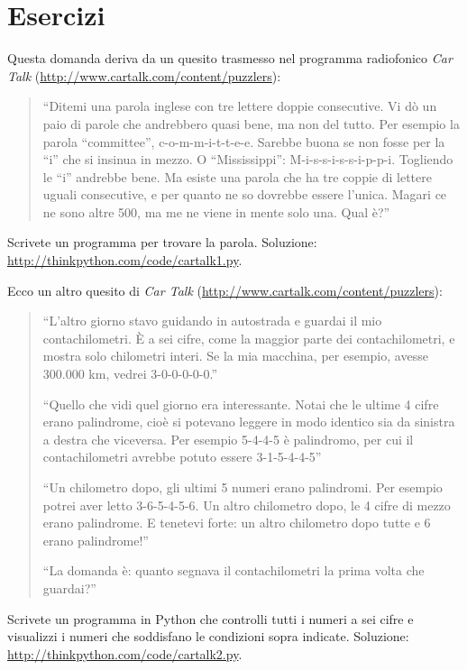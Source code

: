 \documentclass[10pt]{book}
\begin{document}
\section{Esercizi}

\begin{exercise}

Questa domanda deriva da un quesito trasmesso nel programma radiofonico {\em Car Talk} 
(\url{http://www.cartalk.com/content/puzzlers}):

\begin{quote}
``Ditemi una parola inglese con tre lettere doppie consecutive. Vi dò un paio di parole che andrebbero quasi bene, ma non del tutto. Per esempio la parola ``committee'', c-o-m-m-i-t-t-e-e. Sarebbe buona se non fosse per la ``i'' che si insinua in mezzo. O ``Mississippi'': M-i-s-s-i-s-s-i-p-p-i. Togliendo le ``i'' andrebbe bene. Ma esiste una parola che ha tre coppie di lettere uguali consecutive, e per quanto ne so dovrebbe essere l'unica. Magari ce ne sono altre 500, ma me ne viene in mente solo una. Qual è?''
\end{quote}

Scrivete un programma per trovare la parola.  Soluzione: \url{http://thinkpython.com/code/cartalk1.py}.

\end{exercise}

\vspace{0.2in}
\begin{exercise}
Ecco un altro quesito di {\em Car Talk}
(\url{http://www.cartalk.com/content/puzzlers}):

\begin{quote}
``L'altro giorno stavo guidando in autostrada e guardai il mio contachilometri. È a sei cifre, come la maggior parte dei contachilometri, e mostra solo chilometri interi. Se la mia macchina, per esempio, avesse 300.000 km, vedrei 3-0-0-0-0-0.''

``Quello che vidi quel giorno era interessante. Notai che le ultime 4 cifre erano palindrome, cioè si potevano leggere in modo identico sia da sinistra a destra che viceversa. Per esempio 5-4-4-5 è palindromo, per cui il contachilometri avrebbe potuto essere 3-1-5-4-4-5''

``Un chilometro dopo, gli ultimi 5 numeri erano palindromi. Per esempio potrei aver letto 3-6-5-4-5-6. Un altro chilometro dopo, le 4 cifre di mezzo erano palindrome. E tenetevi forte: un altro chilometro dopo tutte e 6 erano palindrome!''

``La domanda è: quanto segnava il contachilometri la prima volta che guardai?''
\end{quote}

Scrivete un programma in Python che controlli tutti i numeri a sei cifre e visualizzi i numeri che soddisfano le condizioni sopra indicate. Soluzione: \url{http://thinkpython.com/code/cartalk2.py}.

\end{exercise}
\end{document}
